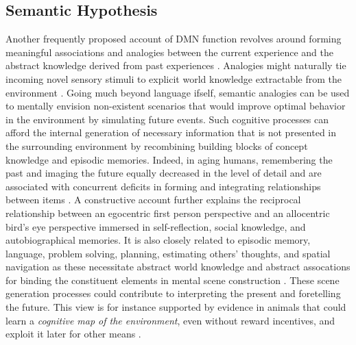 \documentclass{article} %
\begin{document}
\subsection{Semantic Hypothesis}
Another frequently proposed account of DMN function revolves
around forming meaningful associations and analogies between
the current experience and
the abstract knowledge derived from past experiences
\citep{bar2007proactive, binder1999conceptual}.
Analogies might naturally tie incoming novel sensory stimuli to
explicit world knowledge extractable from the environment
\citep{bar2009proactive}.
%
Going much beyond language ifself,
semantic analogies can be used to mentally envision non-existent scenarios
that would improve optimal behavior in the environment
by simulating future events.
Such cognitive processes can afford
the internal generation of necessary information
that is not presented in the surrounding environment
by recombining building blocks of
concept knowledge and episodic memories.
Indeed, in aging humans, remembering the past and imaging the future
equally decreased in the level of detail and are associated with
concurrent deficits in forming and integrating relationships between
items \citep{addis2008age, spreng2006temporal}.
A constructive account further explains the reciprocal relationship
between an egocentric first person perspective and
an allocentric bird’s eye perspective immersed in
self-reflection, social knowledge, and autobiographical memories.
%
It is also closely related to episodic memory, language, problem solving,
planning, estimating others' thoughts, and spatial navigation
as these necessitate abstract world knowledge and abstract assocations
for binding the constituent elements in mental scene construction
\citep{schacter2007remembering}.
These scene generation processes could contribute to interpreting the
present and foretelling the future.
This view is for instance supported by evidence in animals that
could learn a \textit{cognitive map of the environment},
even without reward incentives, and exploit it later
for other means \citep{tolman1948cognitive}.
\end{document}
